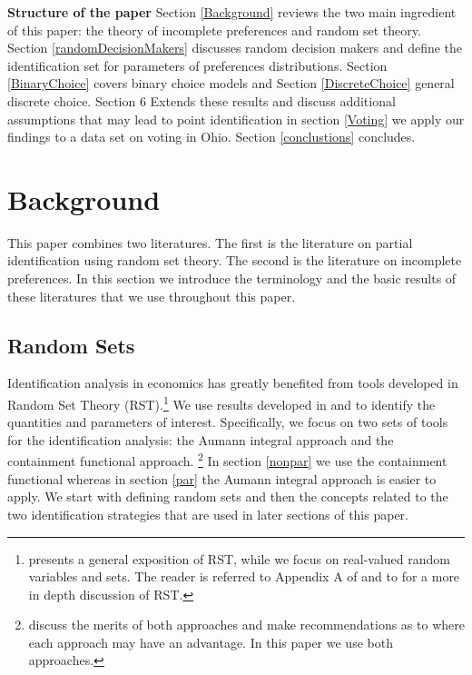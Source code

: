 \documentclass[reqno]{article}
\renewcommand{\cite}{\citet}
\begin{document}
\textbf{Structure of the paper} Section \ref{Background} reviews the two main ingredient of this paper: the theory of incomplete preferences and random set theory. Section \ref{randomDecisionMakers} discusses random decision makers and define the identification set for parameters of preferences distributions. Section \ref{BinaryChoice} covers binary choice models and Section \ref{DiscreteChoice}  general discrete choice. Section 6 Extends these results and discuss additional assumptions that may lead to point identification in section \ref{Voting} we apply our findings to a data set on voting in Ohio. Section \ref{conclustions} concludes.


\section{Background
\label{Background}}

This paper combines two literatures. The first is the literature on partial identification using random set theory. The second is the literature on incomplete preferences. In this section we introduce the terminology and the basic results of these literatures that we use throughout this paper.

\subsection{Random Sets}
\label{RandomSets}
Identification analysis in economics has greatly benefited from tools developed in Random Set Theory (RST).\footnote{\cite{Molchanov2005} presents a general exposition of RST, while we focus on real-valued random variables and sets. The reader is referred to Appendix A of  \cite{BMM2012} and to \cite{Molchanov2005} for a more in depth discussion of RST.} We use results developed in \cite{BMM2011} and \cite{BMM2012} to identify the quantities and parameters of interest. Specifically, we focus on two sets of tools for the identification analysis: the Aumann integral approach and the containment functional approach. \footnote{\cite{BMM2012} discuss the merits of both approaches and make recommendations as to where each approach may have an advantage. In this paper we use both approaches.} In section \ref{nonpar} we use the containment functional whereas in section \ref{par} the Aumann integral approach is easier to apply. We start with defining random sets and then the concepts related to the two identification strategies that are used in later sections of this paper. 
\end{document}
